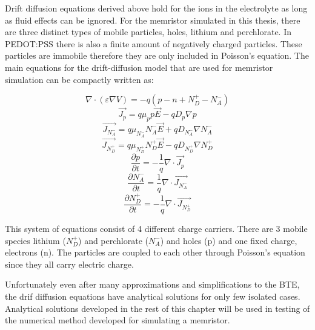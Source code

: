 \begin{doublespace}
Drift diffusion equations derived above hold for the ions in the electrolyte as long as fluid effects can be ignored. For the memristor simulated in this thesis, there are three distinct types of mobile particles, holes, lithium and perchlorate. In PEDOT:PSS there is also a finite amount of negatively charged particles. These particles are immobile therefore they are only included in Poisson's equation. The main equations for the drift-diffusion model that are used for memristor simulation can be compactly written as:

\begin{equation}
\nabla \cdot  (\varepsilon \nabla V)=-q(p-n+N_{D}^{+}-N_{A}^{-})
\end{equation}
\begin{equation}
\vec{J_p}=q\mu_p p \vec{E}-q D_p \nabla p
\end{equation}
\begin{equation}
\vec{J_{N_{A}^{-}}}=q\mu_{N_{A}^{-}} N_{A}^{-} \vec{E}+q D_{N_{A}^{-}} \nabla N_{A}^{-}
\end{equation}
\begin{equation}
\vec{J_{N_{D}^{+}}}=q\mu_{N_{D}^{+}} N_{D}^{+} \vec{E}-q D_{N_{D}^{+}} \nabla N_{D}^{+}
\end{equation}
\begin{equation}
\frac{\partial p}{\partial t}=-\frac{1}{q}\nabla \cdot \vec{J_p}
\end{equation}
\begin{equation}
\frac{\partial N_{A}^{-}}{\partial t}=\frac{1}{q}\nabla \cdot \vec{J_{N_{A}^{-}}}
\end{equation}
\begin{equation}
\frac{\partial N_{D}^{+}}{\partial t}=-\frac{1}{q}\nabla \cdot \vec{J_{N_{D}^{+}}}
\end{equation}

This system of equations consist of 4 different charge carriers. There are 3 mobile species lithium ($N_{D}^{+}$) and perchlorate ($N_{A}^{-}$) and holes (p) and one fixed charge, electrons (n). The particles are coupled to each other through Poisson's equation since they all carry electric charge. 

Unfortunately even after many approximations and simplifications to the BTE, the drif diffusion equations have analytical solutions for only few isolated cases. Analytical solutions developed in the rest of this chapter will be used in testing of the numerical method developed for simulating a memristor. 

\clearpage

\end{doublespace}
